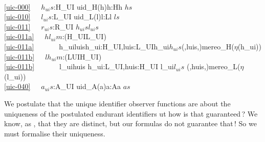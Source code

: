 \bp
{}\\
\ref{uic-000}\ \ \ $h_{ui}s$:H\_UI {\IS} {\LBRACE}uid\_H(h){\BAR}h:H{\RDOT}h {\ISIN} $hs${\RBRACE}\\
\ref{uic-010}\ \ \ $l_{ui}s$:L\_UI {\IS} {\LBRACE}uid\_L(l){\BAR}l:L{\RDOT}l {\ISIN} $ls${\RBRACE} \label{luis}\\
\ref{uic-011}\ \ \ $r_{ui}s$:R\_UI {\IS} $h_{ui}s${\UNION}$l_{ui}s$\\
\ref{uic-011a}\ \ \ $hl_{ui}m$:(H\_UI{\MARROW}L\_UI) {\IS} \\
\ref{uic-011a}\ \ \ \ \ \ \ {\LBRACKET}h\_ui{\MAPSTO}luis{\BAR}h\_ui:H\_UI,luis:L\_UIh\_ui{\ISIN}$h_{ui}s${\WEDGE}({\UNDERLINE},luis,{\UNDERLINE}){\EQ}mereo\_H($\eta$(h\_ui)){\RBRACKET}\\
\ref{uic-011b}\ \ \ $lh_{ui}m$:(L{\PLUS}UI{\MARROW}H\_UI) {\IS} \\
\ref{uic-011b}\ \ \ \ \ \ \ {\LBRACKET}l\_ui{\MAPSTO}huis {\BAR} h\_ui:L\_UI,huis:H\_UI {\RDOT} l\_ui{\ISIN}$l_{ui}s$ {\WEDGE} ({\UNDERLINE},huis,{\UNDERLINE}){\EQ}mereo\_L($\eta$(l\_ui)){\RBRACKET}\\
\ref{uic-040}\ \ \ $a_{ui}s$:A\_UI {\IS} {\LBRACE}uid\_A(a){\BAR}a:A{\RDOT}a {\ISIN} $as${\RBRACE}\ \ \label{auis}\eod
\ep

\begynd
\pind We postulate that the unique identifier observer functions
\begynd
\pind are about the uniqueness of the postulated endurant identifiers
\pind {}ut how is that guaranteed\,?
\pind We know, as ,
\pind that they are distinct,
\pind but our formulas do not guarantee that\,!
\pind So we must formalise their uniqueness.
\afslut
\afslut
\mnewfoil

